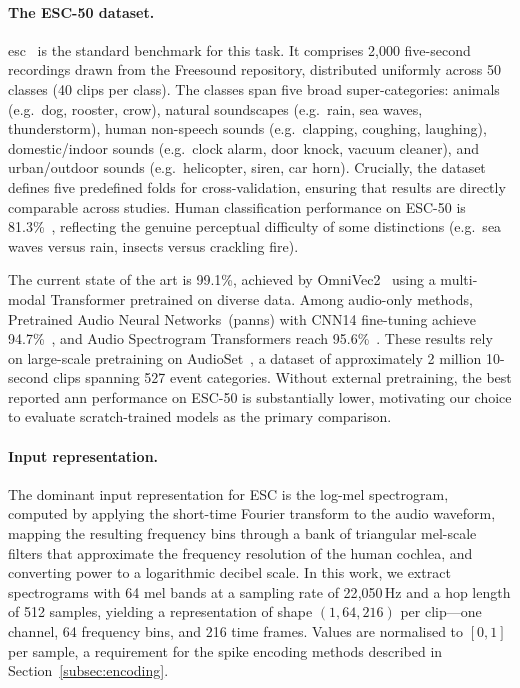 \paragraph{The ESC-50 dataset.}
\gls{esc}~\citep{piczak2015} is the standard benchmark for this task. It comprises 2{,}000 five-second recordings drawn from the Freesound repository, distributed uniformly across 50 classes (40 clips per class). The classes span five broad super-categories: animals (e.g.\ dog, rooster, crow), natural soundscapes (e.g.\ rain, sea waves, thunderstorm), human non-speech sounds (e.g.\ clapping, coughing, laughing), domestic/indoor sounds (e.g.\ clock alarm, door knock, vacuum cleaner), and urban/outdoor sounds (e.g.\ helicopter, siren, car horn). Crucially, the dataset defines five predefined folds for cross-validation, ensuring that results are directly comparable across studies. Human classification performance on ESC-50 is 81.3\%~\citep{piczak2015}, reflecting the genuine perceptual difficulty of some distinctions (e.g.\ sea waves versus rain, insects versus crackling fire).

The current state of the art is 99.1\%, achieved by OmniVec2~\citep{srivastava2024} using a multi-modal Transformer pretrained on diverse data. Among audio-only methods, Pretrained Audio Neural Networks~(\gls{panns}) with CNN14 fine-tuning achieve 94.7\%~\citep{kong2020}, and Audio Spectrogram Transformers reach 95.6\%~\citep{gong2021}. These results rely on large-scale pretraining on AudioSet~\citep{gemmeke2017}, a dataset of approximately 2 million 10-second clips spanning 527 event categories. Without external pretraining, the best reported \gls{ann} performance on ESC-50 is substantially lower, motivating our choice to evaluate scratch-trained models as the primary comparison.

\paragraph{Input representation.}
The dominant input representation for ESC is the log-mel spectrogram, computed by applying the short-time Fourier transform to the audio waveform, mapping the resulting frequency bins through a bank of triangular mel-scale filters that approximate the frequency resolution of the human cochlea, and converting power to a logarithmic decibel scale. In this work, we extract spectrograms with 64 mel bands at a sampling rate of 22{,}050\,Hz and a hop length of 512 samples, yielding a representation of shape $(1, 64, 216)$ per clip---one channel, 64 frequency bins, and 216 time frames. Values are normalised to $[0, 1]$ per sample, a requirement for the spike encoding methods described in Section~\ref{subsec:encoding}.


